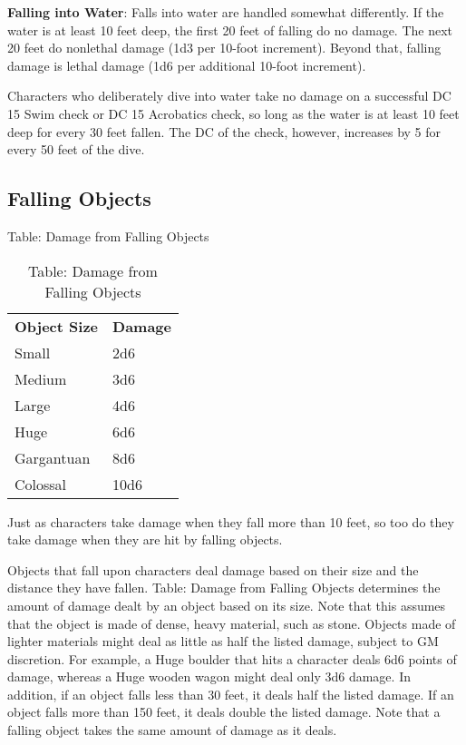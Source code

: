 \textbf{Falling into Water}: Falls into water are handled somewhat differently. If the water is at least 10 feet deep, the first 20 feet of falling do no damage. The next 20 feet do nonlethal damage (1d3 per 10-foot increment). Beyond that, falling damage is lethal damage (1d6 per additional 10-foot increment).
				
Characters who deliberately dive into water take no damage on a successful DC 15 Swim check or DC 15 Acrobatics check, so long as the water is at least 10 feet deep for every 30 feet fallen. The DC of the check, however, increases by 5 for every 50 feet of the dive. 
				
\subsection{Falling Objects}

	
Table: Damage from Falling Objects
\begin{table}[]
\sffamily
\caption{Table: Damage from Falling Objects}
\begin{tabular}{ll}
\textbf{Object Size} & \textbf{Damage}\\
Small & 2d6 \\
 Medium & 3d6 \\
 Large & 4d6 \\
 Huge & 6d6 \\
 Gargantuan & 8d6 \\
 Colossal & 10d6\\
\end{tabular}
\end{table}

				
Just as characters take damage when they fall more than 10 feet, so too do they take damage when they are hit by falling objects.
				
Objects that fall upon characters deal damage based on their size and the distance they have fallen. Table: Damage from Falling Objects determines the amount of damage dealt by an object based on its size. Note that this assumes that the object is made of dense, heavy material, such as stone. Objects made of lighter materials might deal as little as half the listed damage, subject to GM discretion. For example, a Huge boulder that hits a character deals 6d6 points of damage, whereas a Huge wooden wagon might deal only 3d6 damage. In addition, if an object falls less than 30 feet, it deals half the listed damage. If an object falls more than 150 feet, it deals double the listed damage. Note that a falling object takes the same amount of damage as it deals.
				
